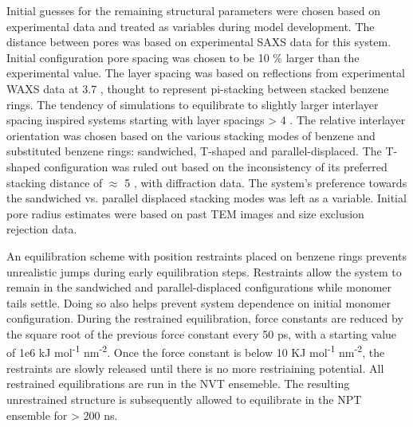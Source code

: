Initial guesses for the remaining structural parameters were chosen
based on experimental data and treated as variables during model
development. The distance between pores was based on experimental SAXS
data for this system. Initial configuration pore spacing was chosen to
be 10 \% larger than the experimental value. The layer spacing was based
on reflections from experimental WAXS data at 3.7 \angstrom, thought to
represent pi-stacking between stacked benzene rings. The tendency of 
simulations to equilibrate to slightly larger interlayer spacing 
inspired systems starting with layer spacings > 4 \angstrom.
The relative interlayer orientation was chosen based on the various 
stacking modes of benzene and substituted benzene rings: sandwiched,
T-shaped and parallel-displaced. The T-shaped configuration was ruled
out based on the inconsistency of its preferred stacking distance of 
$\approx$ 5 \angstrom, with diffraction data. The system's preference
towards the sandwiched vs. parallel displaced stacking modes was left
as a variable. Initial pore radius estimates were based on past TEM 
images and size exclusion rejection data.    

An equilibration scheme with position restraints placed on benzene rings
prevents unrealistic jumps during early equilibration steps. Restraints
allow the system to remain in the sandwiched and parallel-displaced 
configurations while monomer tails settle. Doing so also helps prevent
system dependence on initial monomer configuration. During the restrained
equilibration, force constants are reduced by the square root of the 
previous force constant every 50 ps, with a starting value of 1e6 kJ
mol\textsuperscript{-1} nm\textsuperscript{-2}. Once the force constant
is below 10 KJ mol\textsuperscript{-1} nm\textsuperscript{-2}, the 
restraints are slowly released until there is no more restriaining 
potential. All restrained equilibrations are run in the NVT ensemeble. 
The resulting unrestrained structure is subsequently allowed to 
equilibrate in the NPT ensemble for > 200 ns.  


